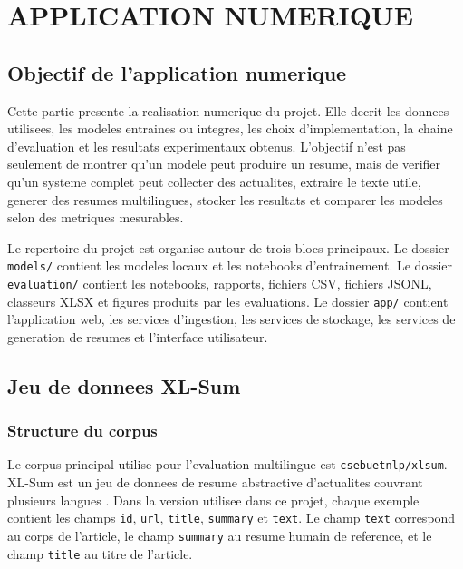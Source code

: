 \chapter{APPLICATION NUMERIQUE}
\thispagestyle{empty}

\section{Objectif de l'application numerique}

Cette partie presente la realisation numerique du projet. Elle decrit les donnees utilisees, les modeles entraines ou integres, les choix d'implementation, la chaine d'evaluation et les resultats experimentaux obtenus. L'objectif n'est pas seulement de montrer qu'un modele peut produire un resume, mais de verifier qu'un systeme complet peut collecter des actualites, extraire le texte utile, generer des resumes multilingues, stocker les resultats et comparer les modeles selon des metriques mesurables.

Le repertoire du projet est organise autour de trois blocs principaux. Le dossier \texttt{models/} contient les modeles locaux et les notebooks d'entrainement. Le dossier \texttt{evaluation/} contient les notebooks, rapports, fichiers CSV, fichiers JSONL, classeurs XLSX et figures produits par les evaluations. Le dossier \texttt{app/} contient l'application web, les services d'ingestion, les services de stockage, les services de generation de resumes et l'interface utilisateur.

\section{Jeu de donnees XL-Sum}

\subsection{Structure du corpus}

Le corpus principal utilise pour l'evaluation multilingue est \texttt{csebuetnlp/xlsum}. XL-Sum est un jeu de donnees de resume abstractive d'actualites couvrant plusieurs langues \citep{Hasan2021XLSum}. Dans la version utilisee dans ce projet, chaque exemple contient les champs \texttt{id}, \texttt{url}, \texttt{title}, \texttt{summary} et \texttt{text}. Le champ \texttt{text} correspond au corps de l'article, le champ \texttt{summary} au resume humain de reference, et le champ \texttt{title} au titre de l'article.

